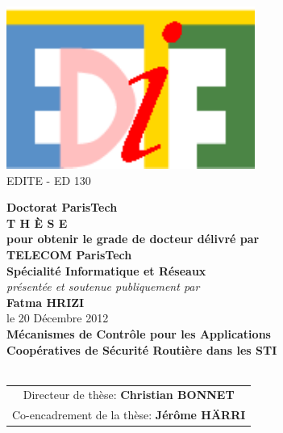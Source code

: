 \documentclass[11pt,a4paper]{book}
\renewcommand\textnumero{n$^{\textsf{{\tiny O}}}$}
\begin{document}
\begin{center}
%


\includegraphics[scale=0.65]{logo_edite.pdf} \\
{\small {EDITE - ED 130}}


%
\vspace{.5cm}
%
%
%
%
%
%
\vspace{1.0cm}
%
%
%
{\LARGE {\bf Doctorat ParisTech}}\\
\vspace{1.1cm}
{\LARGE {\bf T H È S E}}\\
\vspace{0.5cm}
{\normalsize {\bf pour obtenir le grade de docteur délivré par}}\\
%
%
%
\vspace{.9cm}
%
%
%
%
{\LARGE {\bf TELECOM ParisTech}}\\
\vspace{0.6cm}
{\Large {\bf Spécialité \og Informatique et R\'eseaux \fg}}\\
%
%
%
\vspace{.8cm}
%
%
%
{\normalsize {\it présentée et soutenue publiquement par}}\\
\vspace{0.7cm}
{\Large {\bf Fatma HRIZI}}\\
\vspace{0.24cm}
{\normalsize le 20 D\'ecembre 2012}\\
%
%
%
\vfill
%
%
%
\textcolor[RGB]{191,18,56}{
\noindent
{\LARGE {\bf M\'ecanismes de Contr\^ole pour les Applications\\[.6cm] Coop\'eratives de S\'ecurit\'e Routi\`ere dans les STI}}\\
}
%
%
%
\vfill~\vfill
%
%
%
{\normalsize
\begin{tabular}{c}
Directeur de thèse:					{\bf Christian BONNET}\\
Co-encadrement de la thèse:		{\bf J\'er\^ome H\"ARRI}
\end{tabular}
}
\end{center}
\end{document}
